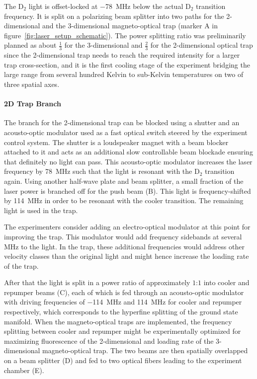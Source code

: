 The D$_2$ light is offset-locked at \SI{-78}{\mega\hertz} below the actual D$_2$ transition frequency. It is split on a polarizing beam splitter into two paths for the 2-dimensional and the 3-dimensional magneto-optical trap (marker A in figure~\ref{fig:laser_setup_schematic}). The power splitting ratio was preliminarily planned as about $\frac{1}{3}$ for the 3-dimensional and $\frac{2}{3}$ for the 2-dimensional optical trap since the 2-dimensional trap needs to reach the required intensity for a larger trap cross-section, and it is the first cooling stage of the experiment bridging the large range from several hundred Kelvin to sub-Kelvin temperatures on two of three spatial axes.

\paragraph{2D Trap Branch} The branch for the 2-dimensional trap can be blocked using a shutter and an acousto-optic modulator used as a fast optical switch steered by the experiment control system. The shutter is a loudspeaker magnet with a beam blocker attached to it and acts as an additional slow controllable beam blockade ensuring that definitely no light can pass. This acousto-optic modulator increases the laser frequency by \SI{+78}{\mega\hertz} such that the light is resonant with the D$_2$ transition again. Using another half-wave plate and beam splitter, a small fraction of the laser power is branched off for the push beam (B). This light is frequency-shifted by \SI{+114}{\mega\hertz} in order to be resonant with the cooler transition. The remaining light is used in the trap.

The experimenters consider adding an electro-optical modulator at this point for improving the trap. This modulator would add frequency sidebands at several \si{\mega\hertz} to the light. In the trap, these additional frequencies would address other velocity classes than the original light and might hence increase the loading rate of the trap.

After that the light is split in a power ratio of approximately $1$:$1$ into cooler and repumper beams (C), each of which is fed through an acousto-optic modulator with driving frequencies of \SI{-114}{\mega\hertz} and \SI{+114}{\mega\hertz} for cooler and repumper respectively, which corresponds to the hyperfine splitting of the ground state manifold. When the magneto-optical traps are implemented, the frequency splitting between cooler and repumper might be experimentally optimized for maximizing fluorescence of the 2-dimensional and loading rate of the 3-dimensional magneto-optical trap. The two beams are then spatially overlapped on a beam splitter (D) and fed to two optical fibers leading to the experiment chamber (E).

